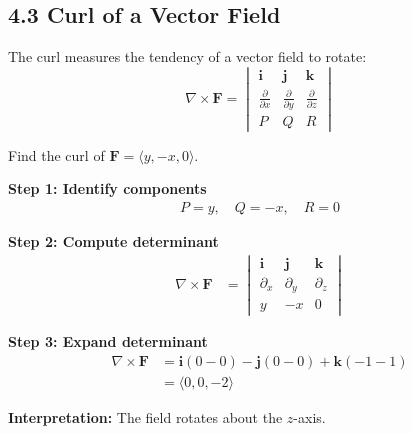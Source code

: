 \subsection*{4.3 Curl of a Vector Field}

\begin{conceptbox}
    The curl measures the tendency of a vector field to rotate:
    \begin{equation*}
        \nabla \times \mathbf{F} =
        \begin{vmatrix}
            \mathbf{i}                  & \mathbf{j}                  & \mathbf{k}                  \\
            \frac{\partial}{\partial x} & \frac{\partial}{\partial y} & \frac{\partial}{\partial z} \\
            P                           & Q                           & R
        \end{vmatrix}
    \end{equation*}
\end{conceptbox}

\begin{examplebox}
    Find the curl of $\mathbf{F}=\langle y, -x, 0 \rangle$.

    \textbf{Step 1: Identify components}
    \begin{align*}
        P=y,\quad Q=-x,\quad R=0
    \end{align*}

    \textbf{Step 2: Compute determinant}
    \begin{align*}
        \nabla \times \mathbf{F}
         & =
        \begin{vmatrix}
            \mathbf{i} & \mathbf{j} & \mathbf{k} \\
            \partial_x & \partial_y & \partial_z \\
            y          & -x         & 0
        \end{vmatrix}
    \end{align*}

    \textbf{Step 3: Expand determinant}
    \begin{align*}
        \nabla \times \mathbf{F}
         & = \mathbf{i}(0-0)
        - \mathbf{j}(0-0)
        + \mathbf{k}(-1 - 1)        \\
         & = \langle 0,0,-2 \rangle
    \end{align*}

    \textbf{Interpretation:} The field rotates about the $z$-axis.
\end{examplebox}

